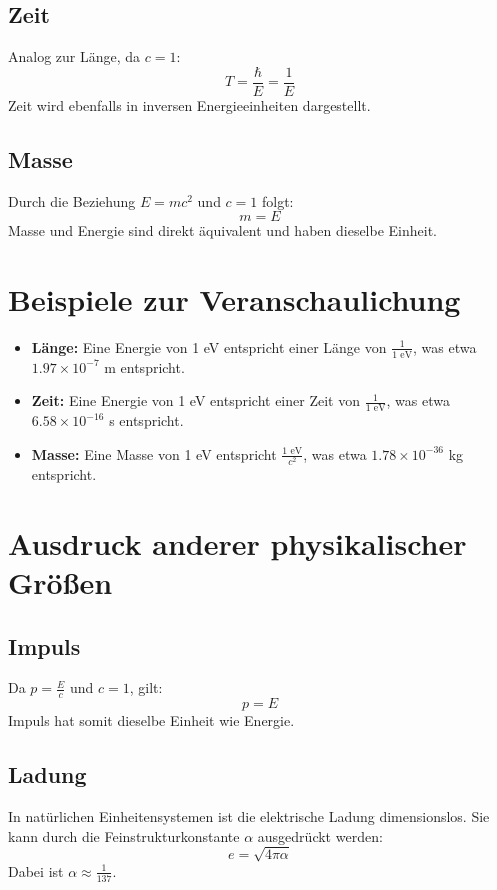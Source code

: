 \documentclass{article}
\begin{document}
\subsection{Zeit}
Analog zur Länge, da $c=1$:
\begin{equation}
	T = \frac{\hbar}{E} = \frac{1}{E}
\end{equation}
Zeit wird ebenfalls in inversen Energieeinheiten dargestellt.

\subsection{Masse}
Durch die Beziehung $E = mc^2$ und $c=1$ folgt:
\begin{equation}
	m = E
\end{equation}
Masse und Energie sind direkt äquivalent und haben dieselbe Einheit.

\section{Beispiele zur Veranschaulichung}

\begin{itemize}
	\item \textbf{Länge:} Eine Energie von 1 eV entspricht einer Länge von $\frac{1}{1\text{ eV}}$, was etwa $1.97 \times 10^{-7}$ m entspricht.
	\item \textbf{Zeit:} Eine Energie von 1 eV entspricht einer Zeit von $\frac{1}{1\text{ eV}}$, was etwa $6.58 \times 10^{-16}$ s entspricht.
	\item \textbf{Masse:} Eine Masse von 1 eV entspricht $\frac{1\text{ eV}}{c^2}$, was etwa $1.78 \times 10^{-36}$ kg entspricht.
\end{itemize}

\section{Ausdruck anderer physikalischer Größen}

\subsection{Impuls}
Da $p = \frac{E}{c}$ und $c=1$, gilt:
\begin{equation}
	p = E
\end{equation}
Impuls hat somit dieselbe Einheit wie Energie.

\subsection{Ladung}
In natürlichen Einheitensystemen ist die elektrische Ladung dimensionslos. Sie kann durch die Feinstrukturkonstante $\alpha$ ausgedrückt werden:
\begin{equation}
	e = \sqrt{4\pi\alpha}
\end{equation}
Dabei ist $\alpha \approx \frac{1}{137}$.
\end{document}
